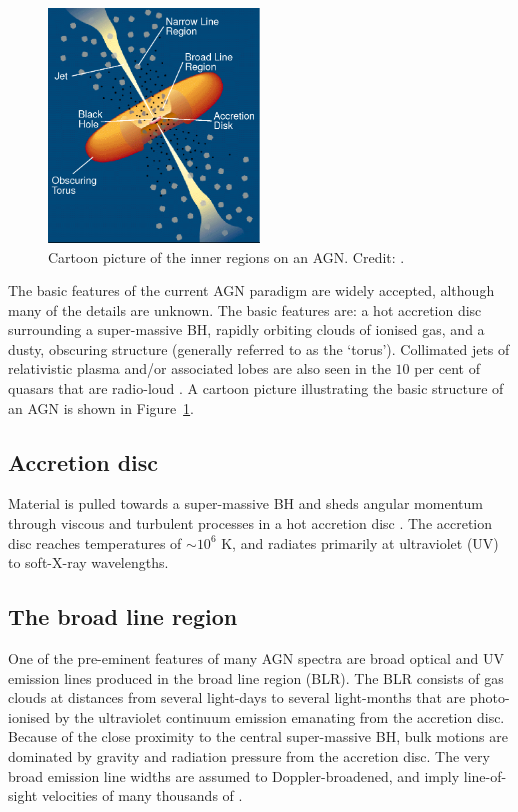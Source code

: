 \begin{figure}
  \centering
  \includegraphics[width=0.5\textwidth]{figures/chapter05/urry_model}
  \caption[{Illustration of the physical structure of an AGN in a simple orientation-based unification model.}]{Cartoon picture of the inner regions on an AGN. Credit: \citet{urry95}.}
  \label{fig:agnmodel}
\end{figure}

The basic features of the current AGN paradigm are widely accepted, although many of the details are unknown. 
The basic features are: a hot accretion disc surrounding a super-massive BH, rapidly orbiting clouds of ionised gas, and a dusty, obscuring structure (generally referred to as the `torus'). 
Collimated jets of relativistic plasma and/or associated lobes are also seen in the $10$ per cent of quasars that are radio-loud \citep[e.g.][]{peterson97}. 
A cartoon picture illustrating the basic structure of an AGN is shown in Figure~\ref{fig:agnmodel}. 

\subsection{Accretion disc}

Material is pulled towards a super-massive BH and sheds angular momentum through viscous and turbulent processes in a hot accretion disc \citep[e.g.][]{begelman85}. 
The accretion disc reaches temperatures of $\sim10^6$ K, and radiates primarily at ultraviolet (UV) to soft-X-ray wavelengths. 

\subsection{The broad line region}

One of the pre-eminent features of many AGN spectra are broad optical and UV emission lines produced in the broad line region (BLR). 
The BLR consists of gas clouds at distances from several light-days to several light-months that are photo-ionised by the ultraviolet continuum emission emanating from the accretion disc.  
Because of the close proximity to the central super-massive BH, bulk motions are dominated by gravity and radiation pressure from the accretion disc.
The very broad emission line widths are assumed to Doppler-broadened, and imply line-of-sight velocities of many thousands of \kms. 


